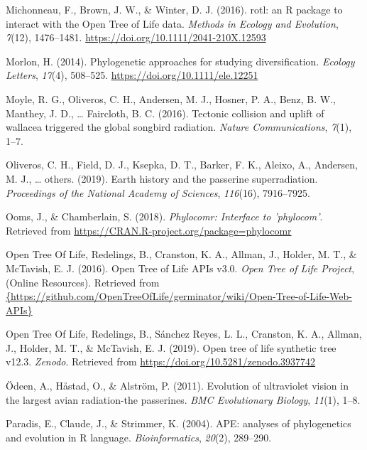 \documentclass[english,man]{apa6}
\begin{document}
\leavevmode\hypertarget{ref-Michonneau2016}{}%
Michonneau, F., Brown, J. W., \& Winter, D. J. (2016). rotl: an R package to interact with the Open Tree of Life data. \emph{Methods in Ecology and Evolution}, \emph{7}(12), 1476--1481. \url{https://doi.org/10.1111/2041-210X.12593}

\leavevmode\hypertarget{ref-Morlon2014}{}%
Morlon, H. (2014). Phylogenetic approaches for studying diversification. \emph{Ecology Letters}, \emph{17}(4), 508--525. \url{https://doi.org/10.1111/ele.12251}

\leavevmode\hypertarget{ref-moyle2016tectonic}{}%
Moyle, R. G., Oliveros, C. H., Andersen, M. J., Hosner, P. A., Benz, B. W., Manthey, J. D., \ldots{} Faircloth, B. C. (2016). Tectonic collision and uplift of wallacea triggered the global songbird radiation. \emph{Nature Communications}, \emph{7}(1), 1--7.

\leavevmode\hypertarget{ref-oliveros2019earth}{}%
Oliveros, C. H., Field, D. J., Ksepka, D. T., Barker, F. K., Aleixo, A., Andersen, M. J., \ldots{} others. (2019). Earth history and the passerine superradiation. \emph{Proceedings of the National Academy of Sciences}, \emph{116}(16), 7916--7925.

\leavevmode\hypertarget{ref-Ooms2018}{}%
Ooms, J., \& Chamberlain, S. (2018). \emph{Phylocomr: Interface to 'phylocom'}. Retrieved from \url{https://CRAN.R-project.org/package=phylocomr}

\leavevmode\hypertarget{ref-opentreeAPIs}{}%
Open Tree Of Life, Redelings, B., Cranston, K. A., Allman, J., Holder, M. T., \& McTavish, E. J. (2016). Open Tree of Life APIs v3.0. \emph{Open Tree of Life Project}, (Online Resources). Retrieved from \href{\%7Bhttps://github.com/OpenTreeOfLife/germinator/wiki/Open-Tree-of-Life-Web-APIs\%7D}{\{https://github.com/OpenTreeOfLife/germinator/wiki/Open-Tree-of-Life-Web-APIs\}}

\leavevmode\hypertarget{ref-opentreeoflife2019synth}{}%
Open Tree Of Life, Redelings, B., Sánchez Reyes, L. L., Cranston, K. A., Allman, J., Holder, M. T., \& McTavish, E. J. (2019). Open tree of life synthetic tree v12.3. \emph{Zenodo}. Retrieved from \url{https://doi.org/10.5281/zenodo.3937742}

\leavevmode\hypertarget{ref-odeen2011evolution}{}%
Ödeen, A., Håstad, O., \& Alström, P. (2011). Evolution of ultraviolet vision in the largest avian radiation-the passerines. \emph{BMC Evolutionary Biology}, \emph{11}(1), 1--8.

\leavevmode\hypertarget{ref-paradis2004}{}%
Paradis, E., Claude, J., \& Strimmer, K. (2004). APE: analyses of phylogenetics and evolution in R language. \emph{Bioinformatics}, \emph{20}(2), 289--290.
\end{document}
